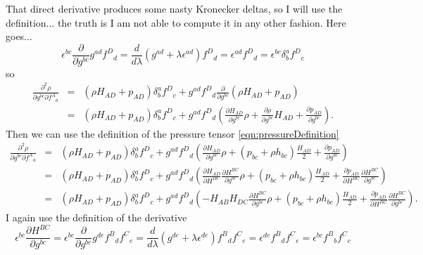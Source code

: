 That direct derivative produces some nasty Kronecker deltas, so I will use the definition... the truth is I am not able to compute it in any other fashion. Here goes...
\begin{equation}
\epsilon^{bc}\frac{\partial}{\partial g^{bc} }g^{ad}f^{D}{}_d = \frac{d}{d\lambda} (g^{ad} + \lambda\epsilon^{ad})f^D{}_d = \epsilon^{ad}f^D{}_d = \epsilon^{bc}\delta^a_bf^D{}_c 
\end{equation}
so
\begin{eqnarray}
\frac{\partial^2 \rho}{\partial g^{bc} \partial f^A{}_a } & = & \left( \rho H_{AD} + p_{AD} \right)\delta^a_bf^D{}_c + g^{ad}f^{D}{}_d\frac{\partial}{\partial g^{bc} }\left( \rho H_{AD} + p_{AD} \right) \\
& = & \left( \rho H_{AD} + p_{AD} \right)\delta^a_bf^D{}_c + g^{ad}f^{D}{}_d \left( \frac{\partial H_{AD}}{\partial g^{bc} }\rho  + \frac{\partial\rho}{\partial g^{bc} } H_{AD} + \frac{\partial p_{AD}}{\partial g^{bc} } \right).
\end{eqnarray}
Then we can use the definition of the pressure tensor \eqref{eqn:pressureDefinition}
\begin{eqnarray}
\frac{\partial^2 \rho}{\partial g^{bc} \partial f^A{}_a } & = & \left( \rho H_{AD} + p_{AD} \right)\delta^a_bf^D{}_c + g^{ad}f^{D}{}_d \left( \frac{\partial H_{AD}}{\partial g^{bc} }\rho  + \left(p_{bc} + \rho h_{bc} \right)\frac{H_{AD}}{2} + \frac{\partial p_{AD}}{\partial g^{bc} } \right)\\
 & = & \left( \rho H_{AD} + p_{AD} \right)\delta^a_bf^D{}_c + g^{ad}f^{D}{}_d \left( \frac{\partial H_{AD}}{\partial H^{BC}}\frac{\partial H^{BC}}{\partial g^{bc} }\rho  + \left(p_{bc} + \rho h_{bc} \right)\frac{H_{AD}}{2} + \frac{\partial p_{AD}}{\partial H^{BC}}\frac{\partial H^{BC}}{\partial g^{bc} } \right) \\
 & = & \left( \rho H_{AD} + p_{AD} \right)\delta^a_bf^D{}_c + g^{ad}f^{D}{}_d \left( -H_{AB}H_{DC}\frac{\partial H^{BC}}{\partial g^{bc} }\rho  + \left(p_{bc} + \rho h_{bc} \right)\frac{H_{AD}}{2} + \frac{\partial p_{AD}}{\partial H^{BC}}\frac{\partial H^{BC}}{\partial g^{bc} } \right).
\end{eqnarray}
I again use the definition of the derivative
\begin{equation}
\epsilon^{bc}\frac{\partial H^{BC}}{\partial g^{bc} } = \epsilon^{bc}\frac{\partial }{\partial g^{bc} } g^{de}f^B{}_df^C{}_e = \frac{d}{d\lambda} (g^{de} + \lambda \epsilon^{de})f^B{}_df^C{}_e = \epsilon^{de}f^B{}_df^C{}_e = \epsilon^{bc}f^B{}_bf^C{}_c
\end{equation}
